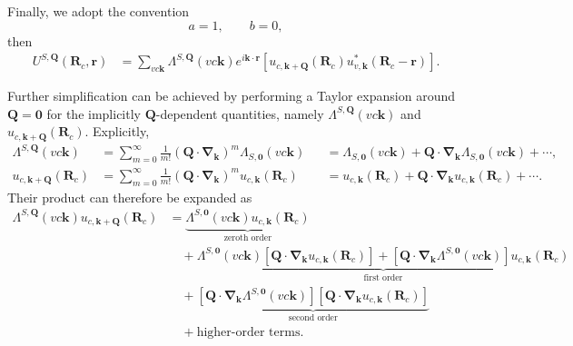 Finally, we adopt the convention
\[
a=1,
\qquad
b=0,
\]
then
\begin{equation}
\begin{aligned}
U^{S,\boldsymbol{Q}} (\boldsymbol{R}_c,\boldsymbol{r})
&=
\sum_{vc\boldsymbol{k}}
\Lambda^{S,\boldsymbol{Q}}(vc\boldsymbol{k})
e^{i\boldsymbol{k}\cdot\boldsymbol{r}}
\left[
u_{c,\boldsymbol{k}+\boldsymbol{Q}}
(\boldsymbol{R}_c)
u^{*}_{v,\boldsymbol{k}}
(\boldsymbol{R}_c-\boldsymbol{r})
\right].
\end{aligned}
\label{excitonWF4}
\end{equation}

Further simplification can be achieved by performing a Taylor expansion around $\boldsymbol{Q}=\boldsymbol{0}$ for the implicitly $\boldsymbol{Q}$-dependent quantities, namely $\Lambda^{S,\boldsymbol{Q}}(vc\boldsymbol{k})$ and $u_{c,\boldsymbol{k}+\boldsymbol{Q}}(\boldsymbol{R}_c)$. Explicitly,
\begin{equation}
\begin{aligned}
\Lambda^{S,\boldsymbol{Q}}(vc\boldsymbol{k})
&=
\sum_{m=0}^{\infty}
\frac{1}{m!}
\left(
\boldsymbol{Q}\cdot
\boldsymbol{\nabla}_{\boldsymbol{k}}
\right)^m
\Lambda_{S,\boldsymbol{0}}(vc\boldsymbol{k})
&&=
\Lambda_{S,\boldsymbol{0}}(vc\boldsymbol{k})
+
\boldsymbol{Q}\cdot
\boldsymbol{\nabla}_{\boldsymbol{k}}
\Lambda_{S,\boldsymbol{0}}(vc\boldsymbol{k})
+\cdots,
\\[0.5em]
u_{c,\boldsymbol{k}+\boldsymbol{Q}}(\boldsymbol{R}_c)
&=
\sum_{m=0}^{\infty}
\frac{1}{m!}
\left(
\boldsymbol{Q}\cdot
\boldsymbol{\nabla}_{\boldsymbol{k}}
\right)^m
u_{c,\boldsymbol{k}}(\boldsymbol{R}_c)
&&=
u_{c,\boldsymbol{k}}(\boldsymbol{R}_c)
+
\boldsymbol{Q}\cdot
\boldsymbol{\nabla}_{\boldsymbol{k}}
u_{c,\boldsymbol{k}}(\boldsymbol{R}_c)
+\cdots.
\end{aligned}
\label{Taylorindi}
\end{equation}
Their product can therefore be expanded as
\begin{equation}
\begin{aligned}
\Lambda^{S,\boldsymbol{Q}}(vc\boldsymbol{k})
u_{c,\boldsymbol{k}+\boldsymbol{Q}}(\boldsymbol{R}_c)
&=
\underbrace{
\Lambda^{S,\boldsymbol{0}}(vc\boldsymbol{k})
u_{c,\boldsymbol{k}}(\boldsymbol{R}_c)
}_{\text{zeroth order}}
\\
&\quad+
\underbrace{
\Lambda^{S,\boldsymbol{0}}(vc\boldsymbol{k})
\left[
\boldsymbol{Q}\cdot
\boldsymbol{\nabla}_{\boldsymbol{k}}
u_{c,\boldsymbol{k}}(\boldsymbol{R}_c)
\right]
+
\left[
\boldsymbol{Q}\cdot
\boldsymbol{\nabla}_{\boldsymbol{k}}
\Lambda^{S,\boldsymbol{0}}(vc\boldsymbol{k})
\right]
u_{c,\boldsymbol{k}}(\boldsymbol{R}_c)
}_{\text{first order}}
\\
&\quad+
\underbrace{
\left[
\boldsymbol{Q}\cdot
\boldsymbol{\nabla}_{\boldsymbol{k}}
\Lambda^{S,\boldsymbol{0}}(vc\boldsymbol{k})
\right]
\left[
\boldsymbol{Q}\cdot
\boldsymbol{\nabla}_{\boldsymbol{k}}
u_{c,\boldsymbol{k}}(\boldsymbol{R}_c)
\right]
}_{\text{second order}}
\\
&\quad+
\text{higher-order terms}.
\end{aligned}
\end{equation}

